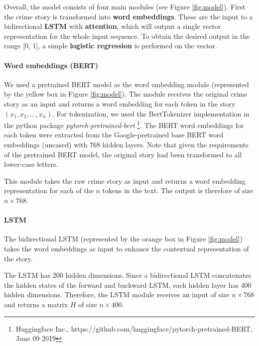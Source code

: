 \documentclass[11pt,a4paper]{article}
\begin{document}
Overall, the model consists of four main modules (see Figure \ref{fig:model}). First the crime story is transformed into \textbf{word embeddings}. These are the input to a bidirectional \textbf{LSTM} with \textbf{attention}, which will output a single vector representation for the whole input sequence. To obtain the desired output in the range [0, 1], a simple \textbf{logistic regression} is performed on the vector. 


\paragraph{Word embeddings (BERT)}
We used a pretrained BERT model as the word embedding module (represented by the yellow box in Figure \ref{fig:model}). The module receives the original crime story as an input and returns a word embedding for each token in the story $(x_1, x_2, ..., x_n)$. For tokenization, we used the BertTokenizer implementation in the python package 
\textit{pytorch-pretrained-bert}
\footnote{Huggingface Inc., https:\slash \slash github.com\slash huggingface\slash pytorch-pretrained-BERT, June 09 2019}. 
The BERT word embeddings for each token were extracted from the Google-pretrained base BERT word embeddings (uncased) with 768 hidden layers. Note that given the requirements of the pretrained BERT model, the original story had been transformed to all lower-case letters.

This module takes the raw crime story as input and returns a word embedding representation for each of the $n$ tokens in the text. The output is therefore of size $n \times 768$.

\paragraph{LSTM}
The bidirectional LSTM (represented by the orange box in Figure \ref{fig:model}) takes the word embeddings as input to enhance the contextual representation of the story.

The LSTM has 200 hidden dimensions. Since a bidirectional LSTM concatenates the hidden states of the forward and backward LSTM, each hidden layer has 400 hidden dimensions. 
Therefore, the LSTM module receives an input of size $n \times 768$ and returns a matrix $H$ of size $n \times 400$.
\end{document}

